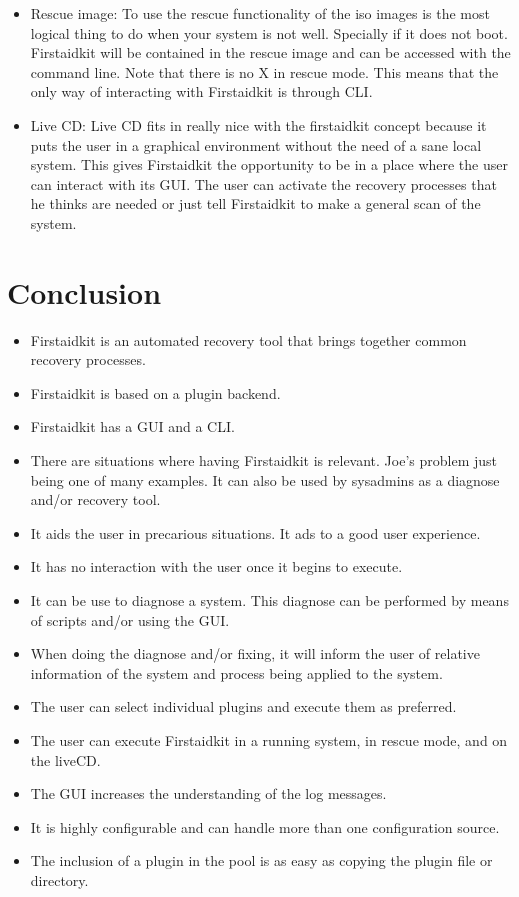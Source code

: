 \documentclass[a4paper,13pt]{article}
\begin{document}
\begin{itemize}
\item Rescue image:
To use the rescue functionality of the iso images is the most logical thing to do when your system is not well.  Specially if it does not boot.  Firstaidkit will be contained in the rescue image and can be accessed with the command line.  Note that there is no X in rescue mode.  This means that the only way of interacting with Firstaidkit is through CLI.
\item Live CD:
Live CD fits in really nice with the firstaidkit concept because it puts the user in a graphical environment without the need of a sane local system.  This gives Firstaidkit the opportunity to be in a place where the user can interact with its GUI.  The user can activate the recovery processes that he thinks are needed or just tell Firstaidkit to make a general scan of the system.
\end{itemize}

\section{Conclusion}
\begin{itemize}
\item Firstaidkit is an automated recovery tool that brings together common recovery processes.
\item Firstaidkit is based on a plugin backend.
\item Firstaidkit has a GUI and a CLI.
\item There are situations where having Firstaidkit is relevant.  Joe's problem just being one of many examples.  It can also be used by sysadmins as a diagnose and/or recovery tool.
\item It aids the user in precarious situations.  It ads to a good user experience.
\item It has no interaction with the user once it begins to execute.
\item It can be use to diagnose a system.  This diagnose can be performed by means of scripts and/or using the GUI.
\item When doing the diagnose and/or fixing, it will inform the user of relative information of the system and process being applied to the system.
\item The user can select individual plugins and execute them as preferred.
\item The user can execute Firstaidkit in a running system, in rescue mode, and on the liveCD.
\item The GUI increases the understanding of the log messages.
\item It is highly configurable and can handle more than one configuration source.
\item The inclusion of a plugin in the pool is as easy as copying the plugin file or directory.
\end{itemize}
\end{document}
